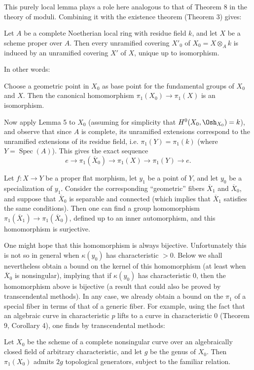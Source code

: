 This purely local lemma plays a role here analogous to that of Theorem 8 in
the theory of moduli. Combining it with the existence theorem (Theorem 3)
gives:

 Let $A$ be a complete Noetherian local ring with residue
field $k$, and let $X$ be a scheme proper over $A$. Then every unramified
covering $X'_0$ of $X_0=X\otimes_A k$ is induced by an unramified covering
$X'$ of $X$, unique up to isomorphism.

In other words:

 Choose a geometric point in $X_0$ as base point for the
fundamental groups of $X_0$ and $X$. Then the canonical homomorphism
$\pi_1(X_0)\longrightarrow\pi_1(X)$ is an isomorphism.

Now apply Lemma 5 to $X_0$ (assuming for simplicity that
$H^0(X_0,\Osh_{X_0})=k$), and observe that since $A$ is complete, its
unramified extensions correspond to the unramified extensions of its residue
field, i.e. $\pi_1(Y)=\pi_1(k)$ (where $Y=\operatorname{Spec}(A)$). This gives
the exact sequence
\[
  e\longrightarrow\pi_1(\overline X_0)
  \longrightarrow\pi_1(X)\longrightarrow\pi_1(Y)\longrightarrow e.
\]

 Let $f:X\longrightarrow Y$ be a proper flat morphism,
let $y_1$ be a point of $Y$, and let $y_0$ be a specialization of $y_1$.
Consider the corresponding “geometric” fibers $\overline X_1$ and
$\overline X_0$, and suppose that $\overline X_0$ is separable and connected
(which implies that $\overline X_1$ satisfies the same conditions). Then one
can find a group homomorphism
$\pi_1(\overline X_1)\longrightarrow\pi_1(\overline X_0)$, defined up to an
inner automorphism, and this homomorphism is surjective.

One might hope that this homomorphism is always bijective. Unfortunately this
is not so in general when $\kappa(y_0)$ has characteristic $>0$. Below we shall
nevertheless obtain a bound on the kernel of this homomorphism (at least when
$\overline X_0$ is nonsingular), implying that if $\kappa(y_0)$ has
characteristic $0$, then the homomorphism above is bijective (a result that
could also be proved by transcendental methods). In any case, we already
obtain a bound on the $\pi_1$ of a special fiber in terms of that of a generic
fiber. For example, using the fact that an algebraic curve in characteristic
$p$ lifts to a curve in characteristic $0$ (Theorem 9, Corollary 4), one finds
by transcendental methods:

 Let $X_0$ be the scheme of a complete nonsingular curve
over an algebraically closed field of arbitrary characteristic, and let $g$ be
the genus of $X_0$. Then $\pi_1(X_0)$ admits $2g$ topological generators,
subject to the familiar relation.

